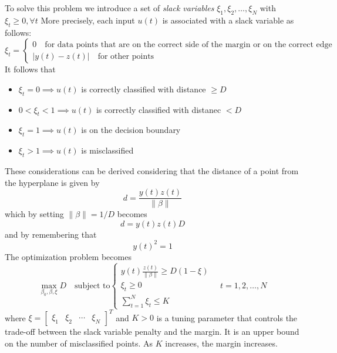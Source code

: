 \documentclass{book}
\theoremstyle{definition}
\theoremstyle{remark}
\theoremstyle{remark}
\begin{document}
To solve this problem we introduce a set of \emph{slack variables} $\xi_1,\xi_2,\dots,\xi_N$ with $\xi_t\geq0, \forall t$ More precisely, each input $u(t)$ is associated with a slack variable as follows:
\[
    \xi_t = \begin{cases}
        0 \quad \text{for data points that are on the correct side of the margin or on the correct edge of the margin}\\
        |y(t)-z(t)| \quad \text{for other points}
    \end{cases}
\]
It follows that 
\begin{itemize}
    \item $\xi_t=0 \implies u(t)$ is correctly classified with distance $\geq D$
    \item $0<\xi_t<1\implies u(t)$ is correctly classified with distanec $<D$
    \item $\xi_t=1 \implies u(t)$ is on the decision boundary
    \item $\xi_t>1 \implies u(t)$ is misclassified
\end{itemize}
These considerations can be derived considering that the distance of a point from the hyperplane is given by 
\[
    d = \frac{y(t)z(t)}{\|\beta\|}
\]
which by setting $\|\beta\|=1/D$ becomes
\[
    d = y(t)z(t)D
\]
and by remembering that $$y(t)^2 = 1$$
The optimization problem becomes 
\[
    \max_{\beta_0,\beta,\xi}D \quad \text{subject to} \begin{cases}
        y(t)\displaystyle\frac{z(t)}{\|\beta\|}\geq D(1-\xi)\\
        \xi_t\geq0\\
        \displaystyle\sum_{t=1}^{N}\xi_t\leq K
    \end{cases} \quad t=1,2,\dots,N
\]
where $\xi=\begin{bmatrix}
  \xi_1 & \xi_2 & \cdots & \xi_N
\end{bmatrix}^T$ and $K>0$ is a tuning parameter that controls the trade-off between the slack variable penalty and the margin. It is an upper bound on the number of misclassified points. As $K$ increases, the margin increases.
\end{document}
